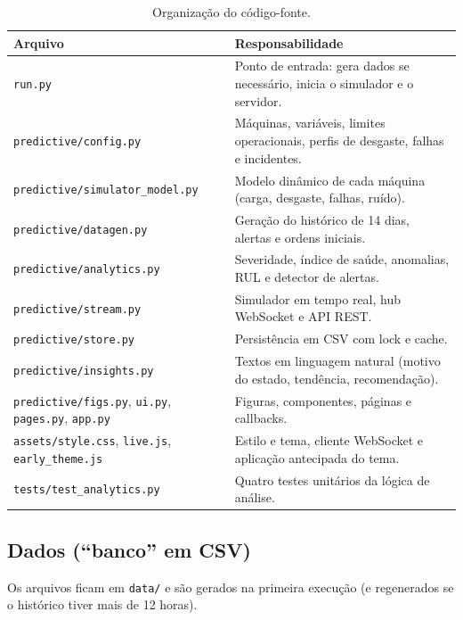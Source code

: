 \documentclass[12pt,a4paper]{article}
\newcommand{\codigo}[1]{\texttt{\small #1}}
\begin{document}
\begin{table}[H]
\centering
\caption{Organização do código-fonte.}
\label{tab:modulos}
\begin{tabularx}{\textwidth}{@{}l X@{}}
\toprule
\textbf{Arquivo} & \textbf{Responsabilidade}\\
\midrule
\codigo{run.py} & Ponto de entrada: gera dados se necessário, inicia o simulador e o servidor.\\
\codigo{predictive/config.py} & Máquinas, variáveis, limites operacionais, perfis de desgaste, falhas e incidentes.\\
\codigo{predictive/simulator\_model.py} & Modelo dinâmico de cada máquina (carga, desgaste, falhas, ruído).\\
\codigo{predictive/datagen.py} & Geração do histórico de 14 dias, alertas e ordens iniciais.\\
\codigo{predictive/analytics.py} & Severidade, índice de saúde, anomalias, RUL e detector de alertas.\\
\codigo{predictive/stream.py} & Simulador em tempo real, hub WebSocket e API REST.\\
\codigo{predictive/store.py} & Persistência em CSV com lock e cache.\\
\codigo{predictive/insights.py} & Textos em linguagem natural (motivo do estado, tendência, recomendação).\\
\codigo{predictive/figs.py}, \codigo{ui.py}, \codigo{pages.py}, \codigo{app.py} & Figuras, componentes, páginas e callbacks.\\
\codigo{assets/style.css}, \codigo{live.js}, \codigo{early\_theme.js} & Estilo e tema, cliente WebSocket e aplicação antecipada do tema.\\
\codigo{tests/test\_analytics.py} & Quatro testes unitários da lógica de análise.\\
\bottomrule
\end{tabularx}
\end{table}

\subsection{Dados (``banco'' em CSV)}
Os arquivos ficam em \codigo{data/} e são gerados na primeira execução (e regenerados se o histórico tiver mais de 12 horas).
\end{document}
